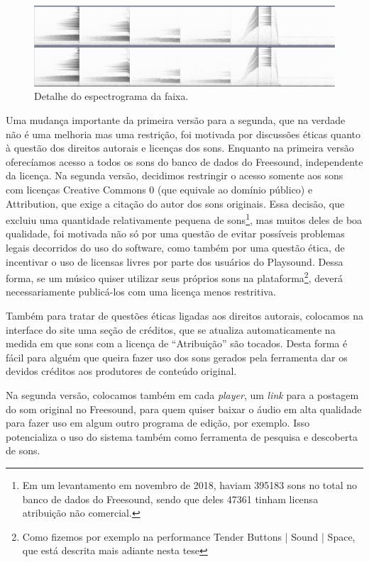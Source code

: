 \begin{figure}

\includegraphics[width=1\textwidth]{pictures/cap4/handbellreverse_detail}
\caption{\label{handbelldt}Detalhe do espectrograma da faixa.}
\label{fig:handbelldt}
\end{figure}


Uma mudança importante da primeira versão para a segunda, que na verdade não é uma melhoria mas uma restrição, foi motivada por discussões éticas quanto à questão dos direitos autorais e licenças dos sons. Enquanto na primeira versão oferecíamos acesso a todos os sons do banco de dados do Freesound, independente da licença. Na segunda versão, decidimos restringir o acesso somente aos sons com licenças Creative Commons 0 (que equivale ao domínio público) e Attribution, que exige a citação do autor dos sons originais. Essa decisão, que excluiu uma quantidade relativamente pequena de sons\footnote{Em um levantamento em novembro de 2018, haviam 395183 sons no total no banco de dados do Freesound, sendo que deles 47361 tinham licensa atribuição não comercial.}, mas muitos deles de boa qualidade, foi motivada não só por uma questão de evitar possíveis problemas legais decorridos do uso do software, como também por uma questão ética, de incentivar o uso de licensas livres por parte dos usuários do Playsound. Dessa forma, se um músico quiser utilizar seus próprios sons na plataforma\footnote{Como fizemos por exemplo na performance Tender Buttons | Sound | Space, que está descrita mais adiante nesta tese}, deverá necessariamente publicá-los com uma licença menos restritiva. 

Também para tratar de questões éticas ligadas aos direitos autorais, colocamos na interface do site uma seção de créditos, que se atualiza automaticamente na medida em que sons com a licença de ``Atribuição'' são tocados. Desta forma é fácil para alguém que queira fazer uso dos sons gerados pela ferramenta dar os devidos créditos aos produtores de conteúdo original. 

Na segunda versão, colocamos também em cada \emph{player}, um \emph{link} para a postagem do som original no Freesound, para quem quiser baixar o áudio em alta qualidade para fazer uso em algum outro programa de edição, por exemplo. Isso potencializa o uso do sistema também como ferramenta de pesquisa e descoberta de sons. 


